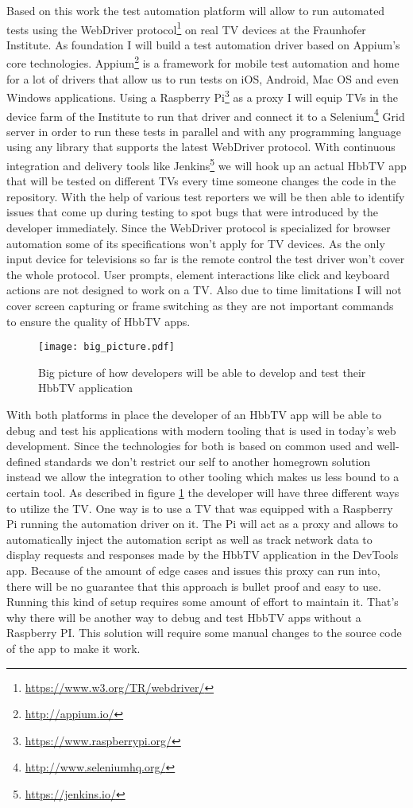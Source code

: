 Based on this work the test automation platform will allow to run automated tests using the WebDriver protocol\footnote{\url{https://www.w3.org/TR/webdriver/}}
on real TV devices at the Fraunhofer Institute. As foundation I will build a test automation driver based on
Appium's core technologies. Appium\footnote{\url{http://appium.io/}} is a framework for mobile test automation
and home for a lot of drivers that allow us to run tests on iOS, Android, Mac OS and even Windows applications.
Using a Raspberry Pi\footnote{\url{https://www.raspberrypi.org/}} as a proxy I will equip TVs in the device farm
of the Institute to run that driver and connect it to a Selenium\footnote{\url{http://www.seleniumhq.org/}} Grid
server in order to run these tests in parallel and with any programming language using any library that supports
the latest WebDriver protocol. With continuous integration and delivery tools like Jenkins\footnote{\url{https://jenkins.io/}}
we will hook up an actual HbbTV app that will be tested on different TVs every time someone changes the code in
the repository. With the help of various test reporters we will be then able to identify issues that come up
during testing to spot bugs that were introduced by the developer immediately. Since the WebDriver protocol is
specialized for browser automation some of its specifications won't apply for TV devices. As the only input
device for televisions so far is the remote control the test driver won't cover the whole protocol. User prompts,
element interactions like click and keyboard actions are not designed to work on a TV. Also due to time
limitations I will not cover screen capturing or frame switching as they are not important commands to ensure
the quality of HbbTV apps.

\begin{figure}[htb]
  \centering
  \texttt{[image: big\_picture.pdf]}
  \caption{Big picture of how developers will be able to develop and test their HbbTV application}\label{fig:bigpicture}
\end{figure}

With both platforms in place the developer of an HbbTV app will be able to debug and test his applications
with modern tooling that is used in today's web development. Since the technologies for both is based on
common used and well-defined standards we don't restrict our self to another homegrown solution instead we
allow the integration to other tooling which makes us less bound to a certain tool. As described in figure
\ref{fig:bigpicture} the developer will have three different ways to utilize the TV. One way is to use
a TV that was equipped with a Raspberry Pi running the automation driver on it. The Pi will act as a proxy
and allows to automatically inject the automation script as well as track network data to display requests
and responses made by the HbbTV application in the DevTools app. Because of the amount of edge cases and
issues this proxy can run into, there will be no guarantee that this approach is bullet proof and easy to
use. Running this kind of setup requires some amount of effort to maintain it. That's why there will be
another way to debug and test HbbTV apps without a Raspberry PI. This solution will require some manual
changes to the source code of the app to make it work.

